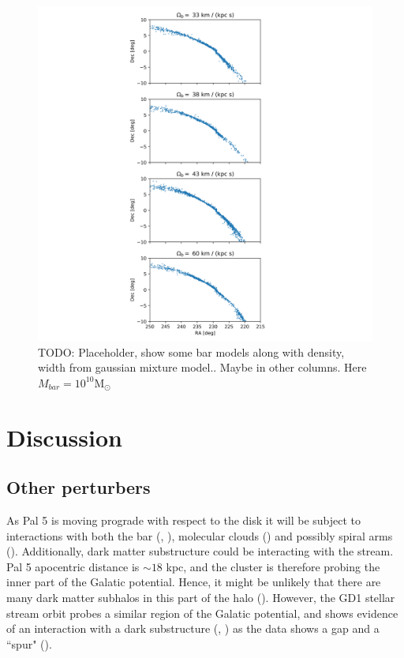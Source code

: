 \documentclass[modern]{aastex62}
\newcommand{\msun}{\textrm{M}_\odot}
\newcommand{\todo}[1]{{\color{red} TODO: #1}}
\begin{document}
\begin{figure}
\centerline{\includegraphics[width=\columnwidth]{bar.png}}
\caption{\todo{Placeholder, show some bar models along with density, width from gaussian mixture model.. Maybe in other columns. Here $M_{bar} = 10^{10} \msun$}}
\label{fig:bar}
\end{figure}

\section{Discussion}
\label{sec:discussion}

\subsection{Other perturbers}
As Pal 5 is moving prograde with respect to the disk it will be subject to interactions with both the bar (\citealt{Hattori:2016}, \citealt{price:2016b}), molecular clouds (\citealt{Amorisco:2016}) and possibly spiral arms (\citealt{Banik:2019}). Additionally, dark matter substructure could be interacting with the stream. Pal 5 apocentric distance is $\sim 18$ kpc, and the cluster is therefore probing the inner part of the Galatic potential. Hence, it might be unlikely that there are many dark matter subhalos in this part of the halo (\citealt{Garrison-Kimmel:2017}). However, the GD1 stellar stream orbit probes a similar region of the Galatic potential, and shows evidence of an interaction with a dark substructure (\citealt{Price-Whelan:2018}, \citealt{Bonaca:2018b}) as the data shows a gap and a ``spur" (\citealt{Yoon:2011}). 
\end{document}
